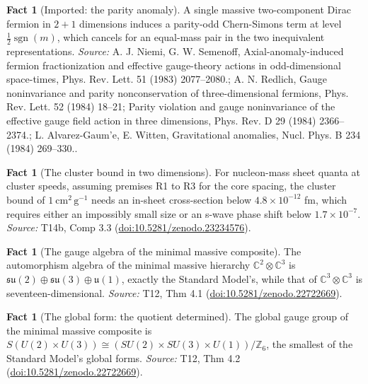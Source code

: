\documentclass[11pt]{article}
\theoremstyle{definition}
\newtheorem{fact}[theorem]{Fact}
\theoremstyle{plain}
\providecommand{\C}{}\renewcommand{\C}{\mathbb{C}}
\providecommand{\cmg}{}\renewcommand{\cmg}{\mathrm{cm^{2}\,g^{-1}}}
\providecommand{\sgn}{}\renewcommand{\sgn}{\operatorname{sgn}}
\providecommand{\su}{}\renewcommand{\su}{\mathfrak{su}}
\providecommand{\uu}{}\renewcommand{\uu}{\mathfrak{u}}
\begin{document}
\begin{fact}[Imported: the parity anomaly]\label{c:rule2.imported-parity-anomaly}
A single massive two-component Dirac fermion in $2+1$ dimensions induces a parity-odd Chern-Simons term at level $\tfrac12\sgn(m)$, which cancels for an equal-mass pair in the two inequivalent representations.
\emph{Source:} A. J. Niemi, G. W. Semenoff, Axial-anomaly-induced fermion fractionization and effective gauge-theory actions in odd-dimensional space-times, Phys. Rev. Lett. 51 (1983) 2077--2080.; A. N. Redlich, Gauge noninvariance and parity nonconservation of three-dimensional fermions, Phys. Rev. Lett. 52 (1984) 18--21; Parity violation and gauge noninvariance of the effective gauge field action in three dimensions, Phys. Rev. D 29 (1984) 2366--2374.; L. Alvarez-Gaum'e, E. Witten, Gravitational anomalies, Nucl. Phys. B 234 (1984) 269--330..
\end{fact}

\begin{fact}[The cluster bound in two dimensions]\label{c:simulations.cluster-bound-two-dimensions}
For nucleon-mass sheet quanta at cluster speeds, assuming premises R1 to R3 for the core spacing, the cluster bound of $1\ \cmg$ needs an in-sheet cross-section below $4.8 \times 10^{-12}$ fm, which requires either an impossibly small size or an s-wave phase shift below $1.7 \times 10^{-7}$.
\emph{Source:} T14b, Comp 3.3 (\href{https://doi.org/10.5281/zenodo.23234576}{doi:10.5281/zenodo.23234576}).
\end{fact}

\begin{fact}[The gauge algebra of the minimal massive composite]\label{c:standard-model.gauge-algebra-minimal-massive-composite}
The automorphism algebra of the minimal massive hierarchy $\C^{2} \otimes \C^{3}$ is $\su(2) \oplus \su(3) \oplus \uu(1)$, exactly the Standard Model's, while that of $\C^{3} \otimes \C^{3}$ is seventeen-dimensional.
\emph{Source:} T12, Thm 4.1 (\href{https://doi.org/10.5281/zenodo.22722669}{doi:10.5281/zenodo.22722669}).
\end{fact}

\begin{fact}[The global form: the quotient determined]\label{c:standard-model.global-form-quotient-determined}
The global gauge group of the minimal massive composite is $S(U(2) \times U(3)) \cong (SU(2) \times SU(3) \times U(1))/\mathbb{Z}_{6}$, the smallest of the Standard Model's global forms.
\emph{Source:} T12, Thm 4.2 (\href{https://doi.org/10.5281/zenodo.22722669}{doi:10.5281/zenodo.22722669}).
\end{fact}
\end{document}
